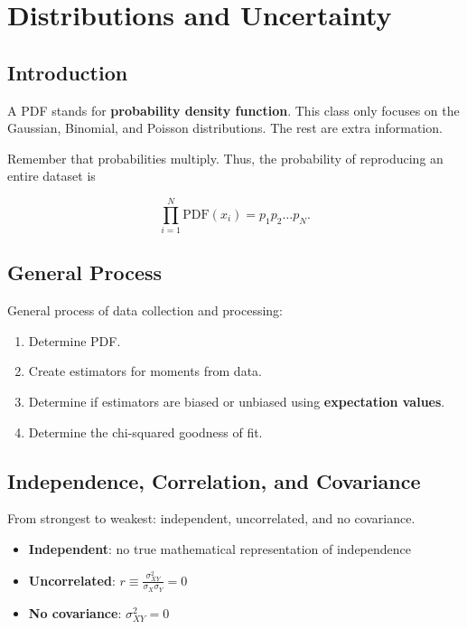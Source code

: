 \section{Distributions and Uncertainty}

\subsection{Introduction}

A PDF stands for \textbf{probability density function}. This class only focuses on the Gaussian, Binomial, and Poisson distributions. The rest are extra information.

\vsp

Remember that probabilities multiply. Thus, the probability of reproducing an entire dataset is

\begin{equation*}
    \prod_{i=1}^{N} \text{PDF}(x_i) = p_1 p_2 \dots p_N\text{.}
\end{equation*}

\subsection{General Process}

General process of data collection and processing:

\begin{enumerate}
    \item Determine PDF.
    \item Create estimators for moments from data.
    \item Determine if estimators are biased or unbiased using \textbf{expectation values}.
    \item Determine the chi-squared goodness of fit.
\end{enumerate}

\subsection{Independence, Correlation, and Covariance}

From strongest to weakest: independent, uncorrelated, and no covariance.

\begin{itemize}
    \item \textbf{Independent}: no true mathematical representation of independence
    \item \textbf{Uncorrelated}: $r \equiv \frac{\sigma^2_{XY}}{\sigma_X \sigma_Y} = 0$
    \item \textbf{No covariance}: $\sigma^2_{XY} = 0$
\end{itemize}

